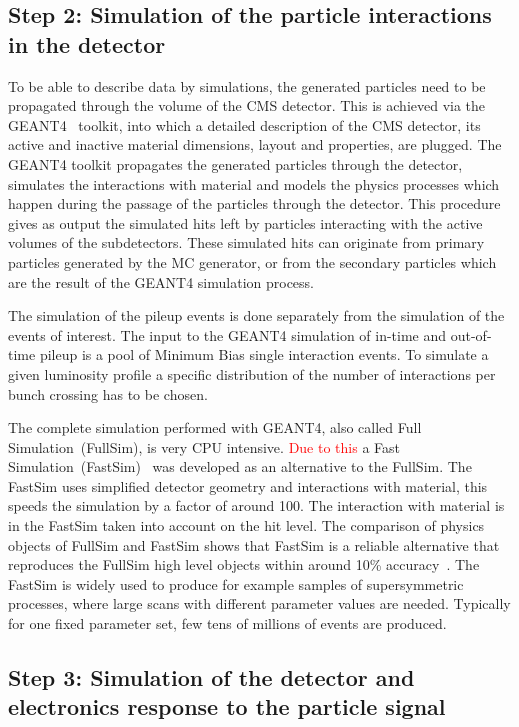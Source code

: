 \subsection{Step 2: Simulation of the particle interactions in the detector}

To be able to describe data by simulations, the generated particles need to be propagated through the volume of the CMS detector. This is achieved via the GEANT4~\cite{Agostinelli:2002hh, Lefebure:1999wja} toolkit, into which a detailed description of the CMS detector, its active and inactive material dimensions, layout and properties, are plugged. The GEANT4 toolkit propagates the generated particles through the detector, simulates the interactions with material and models the physics processes which happen during the passage of the particles through the detector. This procedure gives as output the simulated hits left by particles interacting with the active volumes of the subdetectors. These simulated hits can originate from primary particles generated by the MC generator, or from the secondary particles which are the result of the GEANT4 simulation process.

The simulation of the pileup events is done separately from the simulation of the events of interest. The input to the GEANT4 simulation of in-time and out-of-time pileup is a pool of Minimum Bias single interaction events. To simulate a given luminosity profile a specific distribution of the number of interactions per bunch crossing has to be chosen. 


The complete simulation performed with GEANT4, also called Full Simulation~(FullSim), is very CPU intensive. \textcolor{red}{Due to this} a Fast Simulation~(FastSim)~\cite{Sekmen:2017hzs, CMS:2010spa, Giammanco:2014bza} was developed as an alternative to the FullSim. The FastSim uses simplified detector geometry and interactions with material, this speeds the simulation by a factor of around 100. The interaction with material is in the FastSim taken into account on the hit level. The comparison of physics objects of FullSim and FastSim shows that FastSim is a reliable alternative that reproduces the FullSim high level objects within around 10\% accuracy~\cite{Sekmen:2017hzs, Abdullin:2011zz}. The FastSim is widely used to produce for example samples of supersymmetric processes, where large scans with different parameter values are needed. Typically for one fixed parameter set, few tens of millions of events are produced.

\subsection{Step 3: Simulation of the detector and electronics response to the particle signal}

